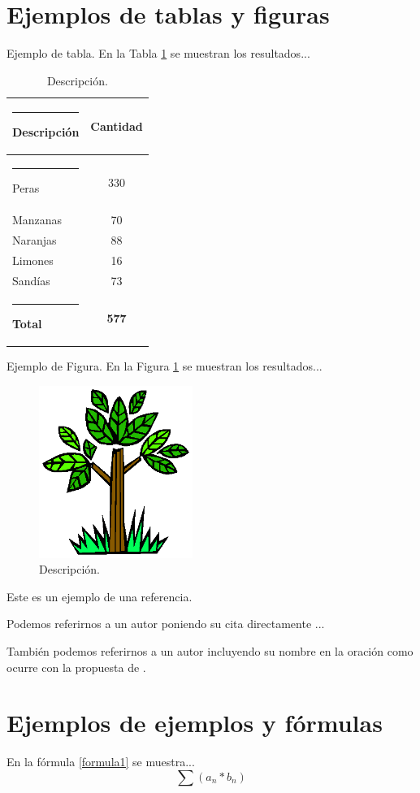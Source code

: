 \documentclass[a4paper,11pt,twocolumn,twoside]{article}
\begin{document}
\section{Ejemplos de tablas y figuras}

Ejemplo de tabla. En la Tabla \ref{tabla1} se muestran los
resultados...
\begin{table} [h]
\begin{center}
\begin{tabular} {|l|c|}
  \hline\rule{-2pt}{15pt}
  {\bf Descripción} & {\bf Cantidad}\\
  \hline\rule{-4pt}{10pt}
  Peras & 330\\
  Manzanas & 70\\
  Naranjas &  88\\
  Limones & 16\\
  Sandías & 73\\
  \hline\rule{-2pt}{10pt}
  {\bf Total}  & {\bf 577}\\
  \hline
\end{tabular}
\end{center}
\caption{\label{tabla1}Descripción.}
\end{table}

Ejemplo de Figura. En la Figura \ref{figura1} se muestran los
resultados...

\begin{figure}[h]
  \centering
  \includegraphics[width=5cm,clip]{ejem1.eps}
  \caption{Descripción.}
  \label{figura1}
\end{figure}


Este es un ejemplo de una referencia.

Podemos referirnos a un autor poniendo su cita directamente
\cite{Allen97}...

También podemos referirnos a un autor incluyendo su nombre en la
oración como ocurre con la propuesta de .

\section{Ejemplos de ejemplos y fórmulas}
En la fórmula \ref{formula1} se muestra...
\begin{equation}
\sum (a_n*b_n) \label{formula1}
\end{equation}
\end{document}
